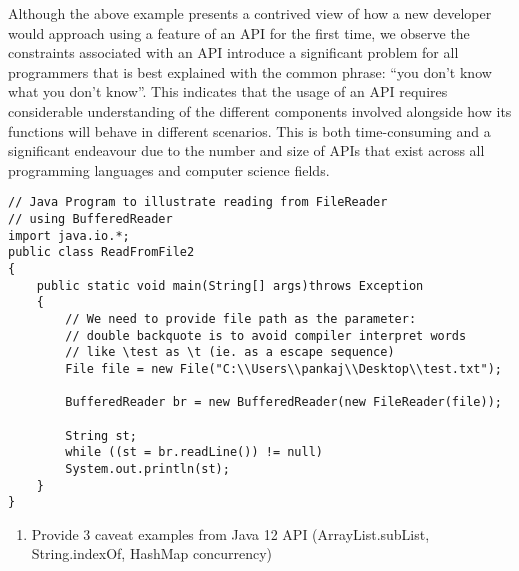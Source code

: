 Although the above example presents a contrived view of how a new developer would approach using a feature of an API for the first time, we observe the constraints associated with an API introduce a significant problem for all programmers that is best explained with the common phrase: ``you don't know what you don't know''. This indicates that the usage of an API requires considerable understanding of the different components involved alongside how its functions will behave in different scenarios. This is both time-consuming and a significant endeavour due to the number and size of APIs that exist across all programming languages and computer science fields.

\begin{lstlisting}[tabsize=4,caption={File reading java code example from GeeksforGeeks},label={lst:code-example}]
// Java Program to illustrate reading from FileReader 
// using BufferedReader 
import java.io.*; 
public class ReadFromFile2 
{ 
	public static void main(String[] args)throws Exception 
	{ 
		// We need to provide file path as the parameter: 
		// double backquote is to avoid compiler interpret words 
		// like \test as \t (ie. as a escape sequence) 
		File file = new File("C:\\Users\\pankaj\\Desktop\\test.txt"); 
		
		BufferedReader br = new BufferedReader(new FileReader(file)); 
		
		String st; 
		while ((st = br.readLine()) != null) 
		System.out.println(st); 
	} 
} 
\end{lstlisting}

\begin{enumerate}
	\item Provide 3 caveat examples from Java 12 API (ArrayList.subList, String.indexOf, HashMap concurrency)
\end{enumerate}

